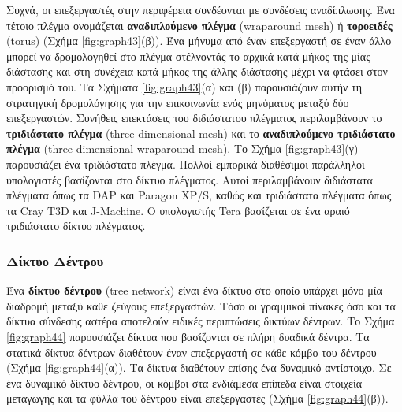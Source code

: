 \documentclass[12pt,a4paper]{article}
\begin{document}
Συχνά, οι επεξεργαστές στην περιφέρεια συνδέονται με συνδέσεις αναδίπλωσης. 
Ένα τέτοιο πλέγμα ονομάζεται \textbf{αναδιπλούμενο πλέγμα} 
(\foreignlanguage{english}{wraparound mesh}) ή \textbf{τοροειδές} (\foreignlanguage{english}{torus}) 
{(}Σχήμα \ref{fig:graph43}(β){)}. Ένα μήνυμα από έναν επεξεργαστή σε έναν άλλο 
μπορεί να δρομολογηθεί στο πλέγμα στέλνοντάς το αρχικά κατά μήκος της μίας 
διάστασης και στη συνέχεια κατά μήκος της άλλης διάστασης μέχρι να φτάσει 
στον προορισμό του. Τα Σχήματα \ref{fig:graph43}(α) και (β) παρουσιάζουν 
αυτήν τη στρατηγική δρομολόγησης για την επικοινωνία ενός μηνύματος μεταξύ 
δύο επεξεργαστών. Συνήθεις επεκτάσεις του διδιάστατου πλέγματος 
περιλαμβάνουν το \textbf{τριδιάστατο πλέγμα} (\foreignlanguage{english}{three-dimensional mesh}) 
και το \textbf{αναδιπλούμενο τριδιάστατο πλέγμα} (\foreignlanguage{english}{three-dimensional wraparound mesh}). 
Το Σχήμα \ref{fig:graph43}(γ) παρουσιάζει ένα τριδιάστατο πλέγμα. Πολλοί εμπορικά διαθέσιμοι 
παράλληλοι υπολογιστές βασίζονται στο δίκτυο πλέγματος. Αυτοί περιλαμβάνουν 
διδιάστατα πλέγματα όπως τα \foreignlanguage{english}{DAP} και 
\foreignlanguage{english}{Paragon XP/S}, καθώς και τριδιάστατα πλέγματα όπως 
τα \foreignlanguage{english}{Cray T3D} και \foreignlanguage{english}{J-Machine}. 
Ο υπολογιστής \foreignlanguage{english}{Tera} βασίζεται σε ένα αραιό τριδιάστατο 
δίκτυο πλέγματος.

\subsubsection*{Δίκτυο Δέντρου} 
Ένα \textbf{δίκτυο δέντρου} (\foreignlanguage{english}{tree network})  
είναι ένα δίκτυο στο οποίο υπάρχει μόνο μία διαδρομή μεταξύ κάθε ζεύγους 
επεξεργαστών. Τόσο οι γραμμικοί πίνακες όσο και τα δίκτυα σύνδεσης 
αστέρα αποτελούν ειδικές περιπτώσεις δικτύων δέντρων. Το Σχήμα \ref{fig:graph44} 
παρουσιάζει δίκτυα που βασίζονται σε πλήρη δυαδικά δέντρα. Τα στατικά 
δίκτυα δέντρων διαθέτουν έναν επεξεργαστή σε κάθε κόμβο του δέντρου {(}Σχήμα \ref{fig:graph44}(α){)}. 
Τα δίκτυα  διαθέτουν επίσης ένα δυναμικό αντίστοιχο. Σε ένα 
δυναμικό δίκτυο δέντρου, οι κόμβοι στα ενδιάμεσα επίπεδα είναι στοιχεία 
μεταγωγής και τα φύλλα του δέντρου είναι επεξεργαστές (Σχήμα \ref{fig:graph44}(β){)}.
\end{document}
